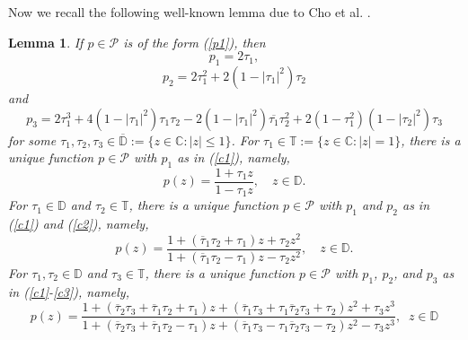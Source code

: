 \documentclass[11pt,reqno]{amsart}
\newtheorem{lem}{Lemma}[section]
\newcommand{\ol}{\overline}
\numberwithin{equation}{section}
\begin{document}
Now we recall the following well-known lemma due to Cho et al. \cite{C12}.
\begin{lem}\label{L1} \cite[Lemma 2.4]{C12} If $p\in\mathcal{P}$ is of the form (\ref{p1}), then
\begin{equation}\label{c1}p_1 =2\tau_1,\end{equation}
\begin{equation}\label{c2} p_2=2\tau_1^2 + 2(1 - |\tau_1|^2)\tau_2\end{equation}
and
\begin{equation}\label{c3} p_3 = 2\tau_1^3+4(1-|\tau_1|^2)\tau_1\tau_2 - 2(1 - |\tau_1|^2)\ol{\tau_1}\tau_2^2 + 2(1 - \tau_1^2)(1 - |\tau_2|^2)\tau_3
\end{equation}
for some $\tau_1, \tau_2, \tau_3 \in\mathbb{\ol D}:= \{z \in \mathbb{C}: |z| \le 1 \}$.
For $ \tau_1 \in \mathbb{T} := \{ z \in \mathbb{C} : |z| = 1 \} $, there is a unique function $ p \in \mathcal{P} $ with $ p_1 $ as in (\ref{c1}), namely,
\[
p(z) = \frac{1 + \tau_1 z}{1 - \tau_1 z}, \quad z \in \mathbb{D}.
\]
For $ \tau_1 \in \mathbb{D} $ and $ \tau_2 \in \mathbb{T} $, there is a unique function $ p \in \mathcal{P} $ with $ p_1 $ and $ p_2 $ as in (\ref{c1}) and (\ref{c2}), namely,
\[
p(z) = \frac{1 + (\ol \tau_1 \tau_2 + \tau_1) z + \tau_2 z^2}{1 + (\ol \tau_1 \tau_2 - \tau_1) z - \tau_2 z^2}, \quad z \in \mathbb{D}.
\]
For $ \tau_1, \tau_2 \in \mathbb{D} $ and $ \tau_3 \in \mathbb{T} $, there is a unique function $ p \in \mathcal{P} $ with $ p_1 $, $ p_2 $, and $ p_3 $ as in (\ref{c1}-\ref{c3}), namely,
\[
p(z) = \frac{1 + (\ol\tau_2 \tau_3 + \ol\tau_1 \tau_2 + \tau_1)z+(\ol\tau_1\tau_3+\tau_1\ol\tau_2\tau_3+\tau_2)z^2+\tau_3z^3}{1+(\ol\tau_2\tau_3+\ol\tau_1\tau_2-\tau_1)z+(\ol\tau_1\tau_3-\tau_1\ol\tau_2\tau_3-\tau_2)z^2-\tau_3z^3},\;\;z\in\mathbb{D}
\]
\end{lem}
\end{document}
